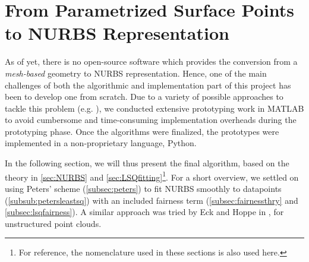 \section{From Parametrized Surface Points to NURBS Representation}
As of yet, there is no open-source software which provides the conversion from a \textit{mesh-based} geometry to NURBS representation. Hence, one of the main challenges of both the algorithmic and implementation part of this project has been to develop one from scratch. Due to a variety of possible approaches to tackle this problem (e.g. \cite{eck1996automatic, becker2011advanced}), we conducted extensive prototyping work in MATLAB \cite{MATLAB} to avoid cumbersome and time-consuming implementation overheads during the prototyping phase. Once the algorithms were finalized, the prototypes were implemented in a non-proprietary language, Python. 

In the following section, we will thus present the final algorithm, based on the theory in \autoref{sec:NURBS} and \autoref{sec:LSQfitting}\footnote{For reference, the nomenclature used in these sections is also used here.}. For a short overview, we settled on using Peters' scheme (\autoref{subsec:peters}) to fit NURBS smoothly to datapoints (\autoref{subsub:petersleastsq}) with an included fairness term (\autoref{subsec:fairnessthry} and \autoref{subsec:lsqfairness}). A similar approach was tried by Eck and Hoppe in \cite{eck1996automatic}, for unstructured point clouds.


